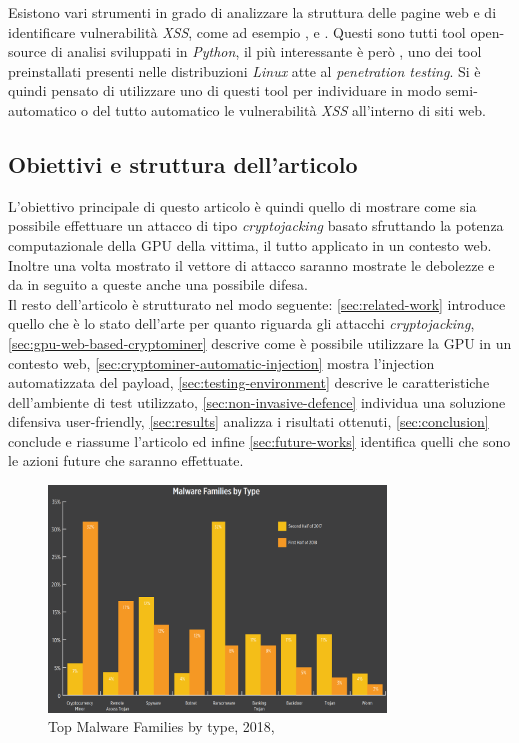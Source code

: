 \documentclass[conference, italian]{IEEEtran}
\newcommand\citetitlen[1]{\citetitle{#1} \citep{#1}}
\begin{document}
Esistono vari strumenti in grado di analizzare la struttura delle pagine web e di identificare vulnerabilità \emph{XSS}, come ad esempio \citetitlen{XSStrike}, \citetitlen{Traxss} e \citetitlen{XSSer}. Questi sono tutti tool open-source di analisi sviluppati in \emph{Python}, il più interessante è però , uno dei tool preinstallati presenti nelle distribuzioni \emph{Linux} atte al \emph{penetration testing}. Si è quindi pensato di utilizzare uno di questi tool per individuare in modo semi-automatico o del tutto automatico le vulnerabilità \emph{XSS} all'interno di siti web.

\subsection{Obiettivi e struttura dell'articolo}\label{subsec:objectives-and-article-structure}
L'obiettivo principale di questo articolo è quindi quello di mostrare come sia possibile effettuare un attacco di tipo \emph{cryptojacking} basato sfruttando la potenza computazionale della GPU della vittima, il tutto applicato in un contesto web. Inoltre una volta mostrato il vettore di attacco saranno mostrate le debolezze e da in seguito a queste anche una possibile difesa.\\
Il resto dell'articolo è strutturato nel modo seguente:
\cref{sec:related-work} introduce quello che è lo stato dell'arte per quanto riguarda gli attacchi \emph{cryptojacking},
\cref{sec:gpu-web-based-cryptominer} descrive come è possibile utilizzare la GPU in un contesto web,
\cref{sec:cryptominer-automatic-injection} mostra l'injection automatizzata del payload,
\cref{sec:testing-environment} descrive le caratteristiche dell'ambiente di test utilizzato,
\cref{sec:non-invasive-defence} individua una soluzione difensiva user-friendly,
\cref{sec:results} analizza i risultati ottenuti,
\cref{sec:conclusion} conclude e riassume l'articolo ed infine
\cref{sec:future-works} identifica quelli che sono le azioni future che saranno effettuate.


\begin{figure}[hbt!]
\centering
\includegraphics[width=0.8\textwidth]{TopMalwareFamilies.png}
\caption{Top Malware Families by type, 2018, \citetitlen{skyboxtrends}}\label{fig:topmalwarefamilies}
\end{figure}
\end{document}
